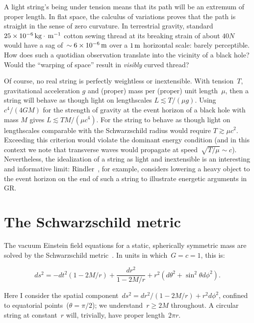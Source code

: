 \documentclass[review]{elsarticle}
\begin{document}
A light string's being under tension means that its path will be an
extremum of proper length.  In flat space, the calculus of variations
proves that the path is straight in the sense of zero curvature.  In
terrestrial gravity, standard $25\times
10^{-6}\unit{kg}\cdot\meter^{-1}$ cotton sewing thread at its breaking
strain of about $40\unit{N}$ would have a sag of~$\sim 6\times
10^{-6}\meter$ over a $1\meter$ horizontal scale: barely perceptible.
How does such a quotidian observation translate into the vicinity of a
black hole?  Would the ``warping of space'' result in {\em visibly}
curved thread?

Of course, no real string is perfectly weightless or inextensible.
With tension~$T$, gravitational acceleration $g$ and (proper) mass per
(proper) unit length~$\mu$, then a string will behave as though light
on lengthscales $L\lesssim T/\left(\mu g\right)$.  Using
$c^4/\left(4GM\right)$ for the strength of gravity at the event
horizon of a black hole with mass $M$ gives $L\lesssim TM/\left(\mu
c^4\right)$.  For the string to behave as though light on lengthscales
comparable with the Schwarzschild radius would require $T\gtrsim\mu
c^2$.  Exceeding this criterion would violate the dominant energy
condition (and in this context we note that transverse waves would
propagate at speed~$\sqrt{T/\mu}\sim c$).  Nevertheless, the
idealization of a string as light and inextensible is an interesting
and informative limit: Rindler~\cite{rindler}, for example, considers
lowering a heavy object to the event horizon on the end of such a
string to illustrate energetic arguments in GR.

\section{The Schwarzschild metric}

The vacuum Einstein field equations for a static, spherically
symmetric mass are solved by the Schwarzschild
metric~\cite{schwarzschild1916}.  In units in which~$G=c=1$, this is:

\begin{equation}\label{schwarzschild}
ds^2= -dt^2\left(1-2M/r\right) +\frac{dr^2}{1-2M/r} + r^2\left(d\theta^2 + \sin^2\theta d\phi^2\right).
\end{equation}

\noindent Here I consider the spatial component~$ds^2=
dr^2/\left(1-2M/r\right) + r^2d\phi^2$, confined to equatorial
points~($\theta=\pi/2$); we understand~$r\geqslant 2M$ throughout.  A
circular string at constant~$r$ will, trivially, have proper
length~$2\pi r$.
\end{document}
